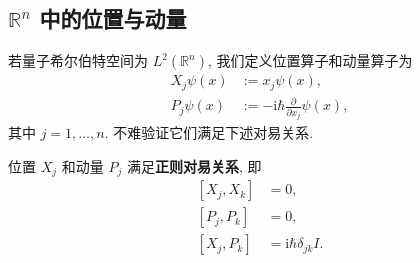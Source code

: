\subsection{\texorpdfstring{$ \mathbb{R}^n $}{Rn} 中的位置与动量}
若量子希尔伯特空间为 $ L^2(\mathbb{R}^n) $, 我们定义位置算子和动量算子为
\begin{align*}
    X_j\psi(x) &:= x_j\psi(x),\\ 
    P_j\psi(x) &:= -\mathrm{i}\hbar\frac{\partial}{\partial x_j}\psi(x),
\end{align*}
其中 $ j=1,\dots,n $. 不难验证它们满足下述对易关系.
\begin{proposition}[正则对易关系]
    位置 $X_j$ 和动量 $P_j$ 满足{\bf 正则对易关系}, 即
    \[\begin{aligned}
        [X_j,X_k] &= 0,\\ 
        [P_j,P_k] &= 0,\\ 
        [X_j,P_k] &= \mathrm{i}\hbar\delta_{jk} I.
    \end{aligned}\]
\end{proposition}

